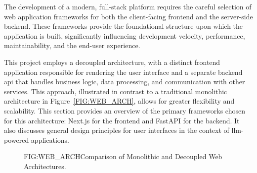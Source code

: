The development of a modern, full-stack platform requires the careful selection of web application frameworks for both the client-facing frontend and the server-side backend. These frameworks provide the foundational structure upon which the application is built, significantly influencing development velocity, performance, maintainability, and the end-user experience.

This project employs a decoupled architecture, with a distinct frontend application responsible for rendering the user interface and a separate backend \acs{api} that handles business logic, data processing, and communication with other services. This approach, illustrated in contrast to a traditional monolithic architecture in Figure~\ref{FIG:WEB_ARCH}, allows for greater flexibility and scalability. This section provides an overview of the primary frameworks chosen for this architecture: Next.js for the frontend and FastAPI for the backend. It also discusses general design principles for user interfaces in the context of \ac{llm}-powered applications.

\begin{figure}[Comparison of Monolithic and Decoupled Web Architectures]{FIG:WEB_ARCH}{Comparison of Monolithic and Decoupled Web Architectures.}
    \centering
    
\end{figure}